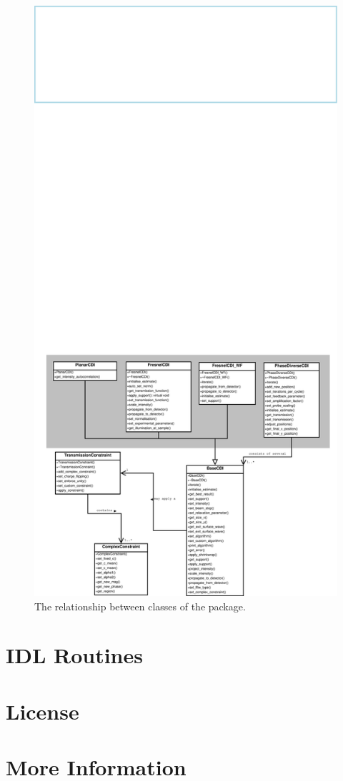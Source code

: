 \documentclass[]{cxs-software}
\begin{document}
\begin{figure}[htbp]
\centering
\includegraphics*[scale=0.3,viewport = 0 0 1500 1200]{cxs_class_diagram.eps}
\caption[]{The relationship between classes of the \name package.
\label{fig:class_diagram}}
\end{figure}



\section{IDL Routines}


\section{License}


\section{More Information}
\end{document}
